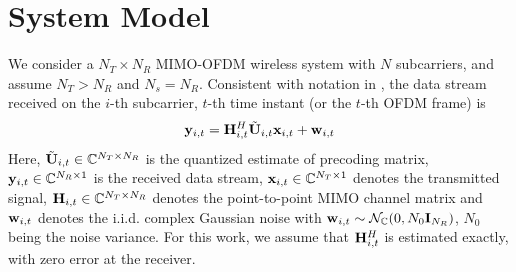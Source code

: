 \documentclass[conference]{IEEEtran}
\begin{document}
{\section{System Model}
\label{section2}
We consider a $N_T\times N_R$ MIMO-OFDM wireless system with $N$ subcarriers, and assume $N_T > N_R$ and $N_s = N_R$.
Consistent with notation in \cite{6891198}, the data stream received on the $i$-th subcarrier, $t$-th time instant (or the $t$-th OFDM frame) is
\begin{equation}
{\bf y}_{i,t}={\bf H}^{H}_{i,t}\tilde{{\bf U}}_{i,t}{\bf x}_{i,t}+ {\bf w}_{i,t}
\end{equation}
Here, $\tilde{{\bf U}}_{i,t} \in \mathbb{C}^{N_T \times N_R}$ is the quantized estimate of precoding matrix, ${\bf y}_{i,t} \in \mathbb{C}^{N_R \times 1}$ is the received data stream, ${\bf x}_{i,t} \in \mathbb{C}^{N_T \times 1}$ denotes the transmitted signal, ${\bf H}_{i,t} \in \mathbb{C}^{N_T \times N_R}$ denotes the point-to-point MIMO channel matrix and ${\bf w}_{i,t}$ denotes the i.i.d. complex Gaussian noise with ${\bf w}_{i,t} \sim \mathcal{N}_{\mathbb{C}}(0,N_0{\bf I}_{N_R})$, $N_0$ being the noise variance. For this work, we assume that ${\bf H}^{H}_{i,t}$ is estimated exactly, with zero error at the receiver.



}
\end{document}
